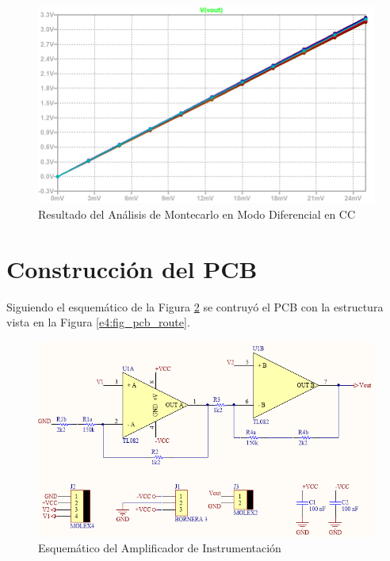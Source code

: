 \begin{figure}[!ht]
\begin{center}
\includegraphics[width=0.85\linewidth]{../Ex4/Informe/res/spice/spice_dm_dc_mc.png}
\caption{Resultado del Análisis de Montecarlo en Modo Diferencial en CC}
\label{e4:fig_spice_dm_dc_mc}
\end{center}
\end{figure}

\pagebreak
\pagebreak
\pagebreak

\section{Construcción del PCB}

Siguiendo el esquemático de la Figura \ref{e4:fig_pcb_sch} se contruyó el PCB con la estructura vista en la Figura \ref{e4:fig_pcb_route}.

\begin{figure}[!ht]
\begin{center}
\includegraphics[width=0.7\linewidth]{../Ex4/Informe/res/altium/sch.png}
\caption{Esquemático del Amplificador de Instrumentación}
\label{e4:fig_pcb_sch}
\end{center}
\end{figure}


